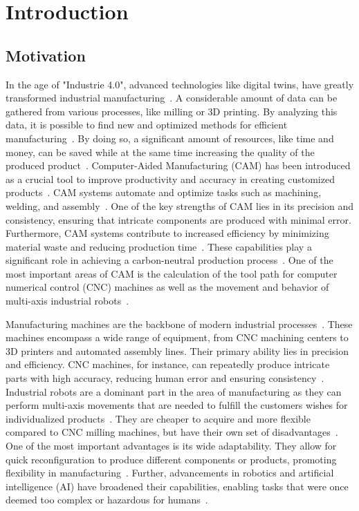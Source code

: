 \chapter{Introduction}%
\section{Motivation}%

In the age of "Industrie 4.0", advanced technologies like digital twins, have greatly transformed industrial manufacturing~\cite{Singh.2021}. A considerable amount of data can be gathered from various processes, like milling or 3D printing. By analyzing this data, it is possible to find new and optimized methods for efficient manufacturing~\cite{Ghobakhloo.2020}. By doing so, a significant amount of resources, like time and money, can be saved while at the same time increasing the quality of the produced product~\cite{Bibby.2018,Simonis.2016}.\newline
Computer-Aided Manufacturing (CAM) has been introduced as a crucial tool to improve productivity and accuracy in creating customized products~\cite{Feldhausen.2022}. CAM systems automate and optimize tasks such as machining, welding, and assembly~\cite{LalitNarayan.2013b}. One of the key strengths of CAM lies in its precision and consistency, ensuring that intricate components are produced with minimal error. Furthermore, CAM systems contribute to increased efficiency by minimizing material waste and reducing production time~\cite{Dubovska.2014}. These capabilities play a significant role in achieving a carbon-neutral production process~\cite{Saxena.2020}. One of the most important areas of CAM is the calculation of the tool path for computer numerical control (CNC) machines as well as the movement and behavior of multi-axis industrial robots~\cite{Pan}. \newline


Manufacturing machines are the backbone of modern industrial processes~\cite{Bi.2020}. These machines encompass a wide range of equipment, from CNC machining centers to 3D printers and automated assembly lines. Their primary ability lies in precision and efficiency. CNC machines, for instance, can repeatedly produce intricate parts with high accuracy, reducing human error and ensuring consistency~\cite{Jia.2018}. \newline
Industrial robots are a dominant part in the area of manufacturing as they can perform multi-axis movements that are needed to fulfill the customers wishes for individualized products~\cite{Sherwani.2020}. They are cheaper to acquire and more flexible compared to CNC milling machines, but have their own set of disadvantages~\cite{Iglesias.2015}. One of the most important advantages is its wide adaptability. They allow for quick reconfiguration to produce different components or products, promoting flexibility in manufacturing~\cite{Billard.2019}. Further, advancements in robotics and artificial intelligence (AI) have broadened their capabilities, enabling tasks that were once deemed too complex or hazardous for humans~\cite{Goel.2020}. \newline

